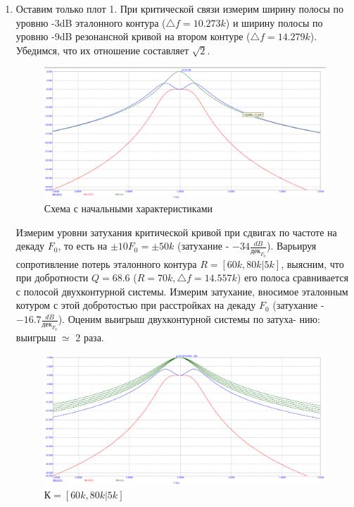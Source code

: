 \documentclass[a4paper, 12pt]{article}%
\begin{document}
\begin{enumerate}
\item Оставим только плот 1. При критической связи измерим ширину полосы по уровню
-3dB эталонного контура ($\bigtriangleup f = 10.273k$) и ширину полосы по уровню -9dB резонансной кривой на втором контуре ($\bigtriangleup f = 14.279k$). Убедимся, что их отношение составляет $\sqrt{2}$.

\begin{figure}[h!]
\centering
\includegraphics[scale = 0.4]{images/plot5_1.png}
\caption{Схема с начальными характеристиками}
\label{fig:Image1}
\end{figure}

Измерим уровни затухания критической кривой при сдвигах по частоте на декаду $F_0$, то есть на $\pm 10 F_0 = \pm 50k$ (затухание - $-34 \frac{dB}{\text{дек}_{F_0}}$). Варьируя сопротивление потерь эталонного контура $R = [60k, 80k | 5k]$, выясним, что при добротности $Q = 68.6$ ($R = 70k, \bigtriangleup f = 14.557k$) его полоса сравнивается с полосой двухконтурной системы. Измерим затухание, вносимое эталонным котуром с этой добротостью при расстройках на декаду $F_0$ (затухание - $- 16.7 \frac{dB}{\text{дек}_{F_0}}$). Оценим выигрыш двухконтурной системы по затуха-
нию: выигрыш $\simeq$ 2 раза.

\begin{figure}[h!]
\centering
\includegraphics[scale = 0.4]{images/plot5_2.png}
\caption{$К = [60k, 80k | 5k]$}
\label{fig:Image1}
\end{figure}


\end{enumerate}
\end{document}

